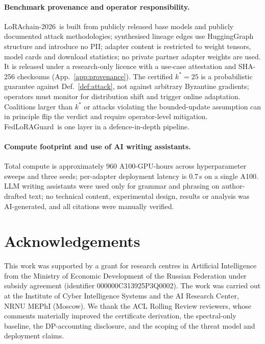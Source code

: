 \documentclass[11pt]{article}
\theoremstyle{plain}
\theoremstyle{definition}
\theoremstyle{remark}
\newcommand{\modelname}{FedLoRAGuard}
\newcommand{\benchname}{LoRAchain-2026}
\begin{document}
\paragraph{Benchmark provenance and operator responsibility.}
\benchname\ is built from publicly released base models and
publicly documented attack methodologies; synthesised lineage
edges use HuggingGraph structure and introduce no PII; adapter
content is restricted to weight tensors, model cards and
download statistics; no private partner adapter weights are used.
It is released under a research-only licence with a use-case
attestation and SHA-256 checksums (App.~\ref{app:provenance}).
The certified $k^*\!=\!25$ is a probabilistic guarantee against
Def.~\ref{def:attack}, not against arbitrary Byzantine gradients;
operators must monitor for distribution shift and trigger online
adaptation. Coalitions larger than $k^*$ or attacks violating the
bounded-update assumption can in principle flip the verdict and
require operator-level mitigation. \modelname\ is one layer in a
defence-in-depth pipeline.

\paragraph{Compute footprint and use of AI writing assistants.}
Total compute is approximately $960$ A100-GPU-hours across
hyperparameter sweeps and three seeds; per-adapter deployment
latency is $0.7$\,s on a single A100. LLM writing assistants
were used only for grammar and phrasing on author-drafted text;
no technical content, experimental design, results or analysis
was AI-generated, and all citations were manually verified.

\section*{Acknowledgements}
This work was supported by a grant for research centres in
Artificial Intelligence from the Ministry of Economic Development
of the Russian Federation under subsidy agreement (identifier
000000C313925P3Q0002). The work was carried out at the Institute
of Cyber Intelligence Systems and the AI Research Center, NRNU
MEPhI (Moscow). We thank the ACL Rolling Review reviewers, whose
comments materially improved the certificate derivation, the
spectral-only baseline, the DP-accounting disclosure, and the
scoping of the threat model and deployment claims.
\end{document}
